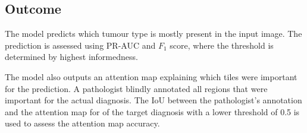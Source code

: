 \subsection{Outcome}

The model predicts which tumour type is mostly present in the input image.
The prediction is assessed using PR-AUC and $F_1$ score, where the threshold is determined by highest informedness.

The model also outputs an attention map explaining which tiles were important for the prediction.
A pathologist blindly annotated all regions that were important for the actual diagnosis.
The IoU between the pathologist's annotation and the attention map for of the target diagnosis with a lower threshold of 0.5 is used to assess the attention map accuracy.
